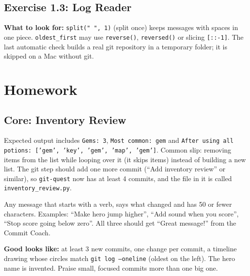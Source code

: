 \subsection{Exercise 1.3: Log Reader}
\begin{answer}
\textbf{What to look for:} \texttt{split(" ", 1)} (split once) keeps messages with spaces in one piece. \texttt{oldest\_first} may use
\texttt{reverse()}, \texttt{reversed()} or slicing \texttt{[::-1]}. The last automatic check builds a real git repository in a temporary
folder; it is skipped on a Mac without git.
\end{answer}

\section{Homework}
\subsection{Core: Inventory Review}
\begin{answer}
Expected output includes \texttt{Gems: 3}, \texttt{Most common: gem} and \texttt{After using all potions: ['gem', 'key', 'gem', 'map', 'gem']}.
Common slip: removing items from the list while looping over it (it skips items) instead of building a new list.
The git step should add one more commit (\enquote{Add inventory review} or similar), so \texttt{git-quest} now has at least 4 commits, and the file in it is called \texttt{inventory\_review.py}.
\end{answer}

\begin{answer}
Any message that starts with a verb, says what changed and has 50 or fewer characters. Examples:
\enquote{Make hero jump higher}, \enquote{Add sound when you score}, \enquote{Stop score going below zero}.
All three should get \enquote{Great message!} from the Commit Coach.
\end{answer}

\begin{answer}
\textbf{Good looks like:} at least 3 new commits, one change per commit, a timeline drawing whose circles match \texttt{git log --oneline}
(oldest on the left). The hero name is invented. Praise small, focused commits more than one big one.
\end{answer}
